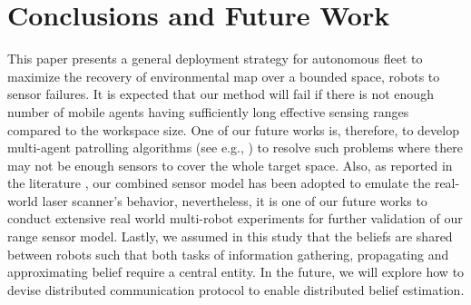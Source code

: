 \documentclass[letterpaper, 10 pt, conference]{ieeeconf}
\begin{document}
\section{Conclusions and Future Work}
\label{sec:sec9}
This paper presents a general deployment strategy for autonomous fleet to maximize the recovery of environmental map over a bounded space, robots to sensor failures. 
It is expected that our method will fail if there is not enough number of mobile agents having sufficiently long effective sensing ranges compared to the workspace size. 
One of our future works is, therefore, to develop multi-agent patrolling algorithms (see e.g., \cite{portugal2011survey}) to resolve such problems where there may not be enough sensors to cover the whole target space.
Also, as reported in the literature \cite{anguelov2004detecting}, our combined sensor model has been adopted to emulate the real-world laser scanner's behavior, nevertheless, it is one of our future works to conduct extensive real world multi-robot experiments for further validation of our range sensor model.
Lastly, we assumed in this study that the beliefs are shared between robots such that both tasks of information gathering, propagating and approximating belief require a central entity. 
In the future, we will explore how to devise distributed communication protocol to enable distributed belief estimation. 




\end{document}
